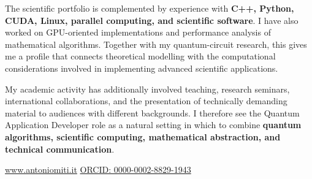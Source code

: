 \documentclass[10pt,a4paper]{article}
\begin{document}
The scientific portfolio is complemented by experience with \textbf{C++, Python, CUDA, Linux, parallel computing, and
scientific software}. I have also worked on GPU-oriented implementations and performance analysis of mathematical
algorithms. Together with my quantum-circuit research, this gives me a profile that connects theoretical modelling with
the computational considerations involved in implementing advanced scientific applications.

My academic activity has additionally involved teaching, research seminars, international collaborations, and the
presentation of technically demanding material to audiences with different backgrounds. I therefore see the
Quantum Application Developer role as a natural setting in which to combine \textbf{quantum algorithms, scientific
computing, mathematical abstraction, and technical communication}.

\vfill

\noindent
\href{https://www.antoniomiti.it/}{www.antoniomiti.it}
\hfill
\href{https://orcid.org/0000-0002-8829-1943}{ORCID: 0000-0002-8829-1943}
\end{document}
